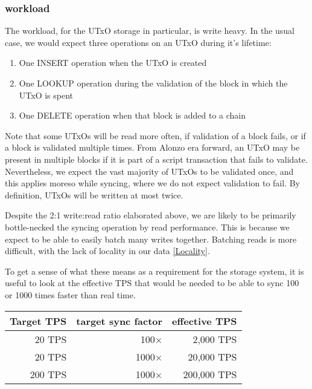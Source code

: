\documentclass[11pt,a4paper]{article}
\begin{document}
\subsubsection{workload}
\label{workload}
The workload, for the UTxO storage in particular, is write heavy. In the usual
case, we would expect three operations on an UTxO during it's lifetime:

\begin{enumerate}
\item One INSERT operation when the UTxO is created
\item One LOOKUP operation during the validation of the block in which the UTxO is spent
\item One DELETE operation when that block is added to a chain
\end{enumerate}

Note that some UTxOs will be read more often, if validation of a block fails, or
if a block is validated multiple times. From Alonzo era forward, an UTxO may be
present in multiple blocks if it is part of a script transaction that fails to
validate. Nevertheless, we expect the vast majority of UTxOs to be validated
once, and this applies moreso while syncing, where we do not expect validation
to fail. By definition, UTxOs will be written at most twice.

Despite the 2:1 write:read ratio elaborated above, we are likely to be primarily
bottle-necked the syncing operation by read performance. This is because we
expect to be able to easily batch many writes together. Batching reads is more
difficult, with the lack of locality in our data \ref{Locality}.

To get a sense of what these means as a requirement for the storage system, it
is useful to look at the effective TPS that would be needed to be able to sync
100 or 1000 times faster than real time.
\begin{center}
\begin{tabular}[]{rrr}
  Target TPS & target sync factor & effective TPS \\
  \toprule
   20 TPS &   100$\times$ &   2,000 TPS \\
   20 TPS &  1000$\times$ &  20,000 TPS \\
  200 TPS &  1000$\times$ & 200,000 TPS
\end{tabular}
\end{center}
\end{document}
